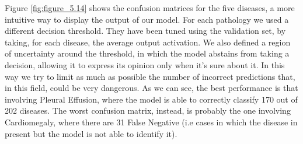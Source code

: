 Figure \ref{fig:figure_5.14} shows the confusion matrices for the five diseases, a more intuitive way to display the output of our model. For each pathology we used a different decision threshold. They have been tuned using the validation set, by taking, for each disease, the average output activation. We also defined a region of uncertainty around the threshold, in which the model abstains from taking a decision, allowing it to express its opinion only when it's sure about it. In this way we try to limit as much as possible the number of incorrect predictions that, in this field, could be very dangerous. As we can see, the best performance is that involving Pleural Effusion, where the model is able to correctly classify 170 out of 202 diseases. The worst confusion matrix, instead, is probably the one involving Cardiomegaly, where there are 31 False Negative (i.e cases in which the disease in present but the model is not able to identify it).
\vspace{7mm}

